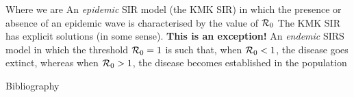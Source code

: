 \documentclass[aspectratio=169]{beamer}\usepackage[]{graphicx}\usepackage[]{xcolor}
\begin{document}
\begin{frame}{Where we are}
\bbullet An \emph{epidemic} SIR model (the KMK SIR) in which the presence or absence of an epidemic wave is characterised by the value of $\mathcal{R}_0$
\vfill
\bbullet The KMK SIR has explicit solutions (in some sense). \textbf{This is an exception!}
\vfill
\bbullet An \emph{endemic} SIRS model in which the threshold $\mathcal{R}_0=1$ is such that, when $\mathcal{R}_0<1$, the disease goes extinct, whereas when $\mathcal{R}_0>1$, the disease becomes established in the population
\end{frame}


\begin{frame}{Bibliography}


\end{frame}
\end{document}

